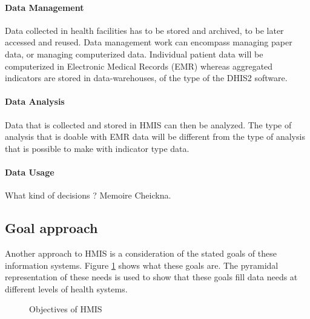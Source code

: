 \documentclass[a4paper,11pt,final,twoside]{article}
\begin{document}
\paragraph{Data Management} Data collected in health facilities has to be stored and archived, to be later accessed and reused. Data management work can encompass managing paper data, or managing computerized data. Individual patient data will be computerized in Electronic Medical Records (EMR) whereas aggregated indicators are stored in data-warehouses, of the type of the DHIS2 software.

\paragraph{Data Analysis} Data that is collected and stored in HMIS can then be analyzed. The type of analysis that is doable with EMR data will be different from the type of analysis that is possible to make with indicator type data. 

\paragraph{Data Usage} What kind of decisions ? Memoire Cheickna.


	\subsection{Goal approach}

Another approach to HMIS is a consideration of the stated goals of these information systems. Figure \ref{HMISGoals} shows what these goals are. The pyramidal representation of these needs is used to show that these goals fill data needs at different levels of health systems.

\begin{figure}[htp]
\centering
{}
\caption{Objectives of HMIS}
\label{HMISGoals}
\end{figure}
\end{document}
